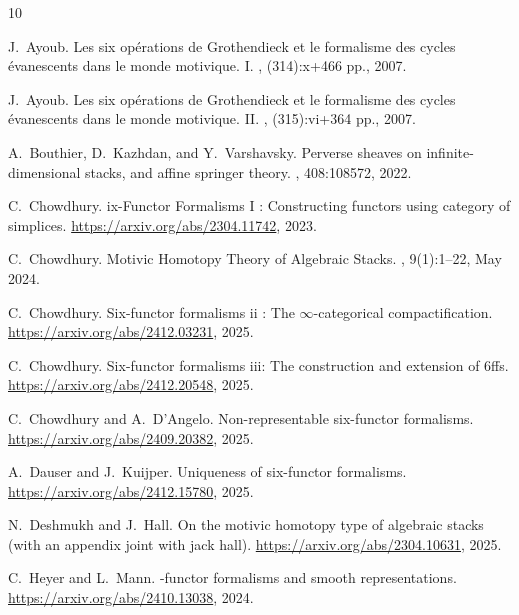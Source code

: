 \documentclass[14pt]{article}
\theoremstyle{definition}
\numberwithin{subsection}{section}
\begin{document}

\begin{thebibliography}{10}

J.~Ayoub.
\newblock Les six op\'{e}rations de {G}rothendieck et le formalisme des cycles
  \'{e}vanescents dans le monde motivique. {I}.
, (314):x+466 pp., 2007.

J.~Ayoub.
\newblock Les six op\'{e}rations de {G}rothendieck et le formalisme des cycles
  \'{e}vanescents dans le monde motivique. {II}.
, (315):vi+364 pp., 2007.

A.~Bouthier, D.~Kazhdan, and Y.~Varshavsky.
\newblock Perverse sheaves on infinite-dimensional stacks, and affine springer
  theory.
, 408:108572, 2022.

C.~Chowdhury.
ix-{F}unctor {F}ormalisms {I} : {C}onstructing functors using
  category of simplices.
\newblock \url{https://arxiv.org/abs/2304.11742}, 2023.

C.~Chowdhury.
\newblock Motivic {H}omotopy {T}heory of {A}lgebraic {S}tacks.
, 9(1):1–22, May 2024.

C.~Chowdhury.
\newblock Six-functor formalisms ii : The $\infty$-categorical
  compactification.
\newblock \url{https://arxiv.org/abs/2412.03231}, 2025.

C.~Chowdhury.
\newblock Six-functor formalisms iii: The construction and extension of 6ffs.
\newblock \url{https://arxiv.org/abs/2412.20548}, 2025.

C.~Chowdhury and A.~D'Angelo.
\newblock Non-representable six-functor formalisms.
\newblock \url{https://arxiv.org/abs/2409.20382}, 2025.

A.~Dauser and J.~Kuijper.
\newblock Uniqueness of six-functor formalisms.
\newblock \url{https://arxiv.org/abs/2412.15780}, 2025.

N.~Deshmukh and J.~Hall.
\newblock On the motivic homotopy type of algebraic stacks (with an appendix
  joint with jack hall).
\newblock \url{https://arxiv.org/abs/2304.10631}, 2025.

C.~Heyer and L.~Mann.
-functor formalisms and smooth representations.
\newblock \url{https://arxiv.org/abs/2410.13038}, 2024.


\end{thebibliography}
\end{document}
